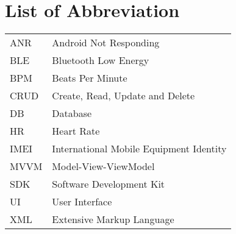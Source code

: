 \chapter{List of Abbreviation}

\begin{longtable}{p{} p{}}
    ANR & Android Not Responding \\
    BLE & Bluetooth Low Energy \\
    BPM & Beats Per Minute \\
    CRUD & Create, Read, Update and Delete \\
    DB & Database \\
    HR & Heart Rate \\
    IMEI & International Mobile Equipment Identity \\
    MVVM & Model-View-ViewModel \\
    SDK & Software Development Kit \\
    UI & User Interface \\
    XML & Extensive Markup Language

\end{longtable}